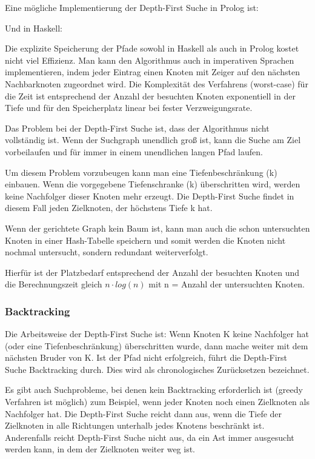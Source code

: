 Eine mögliche Implementierung der Depth-First Suche in Prolog ist:




Und in Haskell:



Die explizite Speicherung der Pfade sowohl in Haskell als auch in Prolog kostet nicht viel Effizienz. Man kann den Algorithmus auch in imperativen Sprachen implementieren, indem jeder Eintrag einen Knoten mit Zeiger auf den nächsten Nachbarknoten zugeordnet wird. Die Komplexität des Verfahrens (worst-case) für die Zeit ist entsprechend der Anzahl der besuchten Knoten exponentiell in der Tiefe und für den Speicherplatz linear bei fester Verzweigungsrate.

Das Problem bei der Depth-First Suche ist, dass der Algorithmus nicht vollständig ist. Wenn der Suchgraph unendlich groß ist, kann die Suche am Ziel vorbeilaufen und für immer in einem unendlichen langen Pfad laufen.

Um diesem Problem vorzubeugen kann man eine Tiefenbeschränkung (k) einbauen. Wenn die vorgegebene Tiefenschranke (k) überschritten wird, werden keine Nachfolger dieser Knoten mehr erzeugt. Die Depth-First Suche findet in diesem Fall jeden Zielknoten, der höchstens Tiefe k hat.

Wenn der gerichtete Graph kein Baum ist, kann man auch die schon untersuchten Knoten in einer Hash-Tabelle speichern und somit werden die Knoten nicht nochmal untersucht, sondern redundant weiterverfolgt.

Hierfür ist der Platzbedarf entsprechend der Anzahl der besuchten Knoten und die Berechnungszeit gleich $n\cdot log(n)$ mit n = Anzahl der untersuchten Knoten.

\subsubsection{Backtracking}
Die Arbeitsweise der Depth-First Suche ist: Wenn Knoten K keine Nachfolger hat (oder eine Tiefenbeschränkung) überschritten wurde, dann mache weiter mit dem nächsten Bruder von K. Ist der Pfad nicht erfolgreich, führt die Depth-First Suche Backtracking durch. Dies wird als chronologisches Zurücksetzen bezeichnet.

Es gibt auch Suchprobleme, bei denen kein Backtracking erforderlich ist (greedy Verfahren ist möglich) zum Beispiel, wenn jeder Knoten noch einen Zielknoten als Nachfolger hat. Die Depth-First Suche reicht dann aus, wenn die Tiefe der Zielknoten in alle Richtungen unterhalb jedes Knotens beschränkt ist. Anderenfalls reicht Depth-First Suche nicht aus, da ein Ast immer ausgesucht werden kann, in dem der Zielknoten weiter weg ist.

